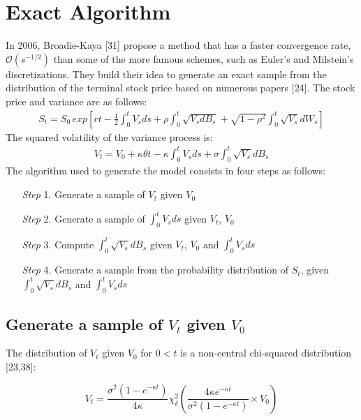 \documentclass[12pt,twoside]{reedthesis}
\theoremstyle{definition}
\theoremstyle{definition}
\theoremstyle{remark}
\begin{document}
  \section{Exact Algorithm}\label{exact-algorithm}
  
  In 2006, Broadie-Kaya {[}31{]} propose a method that has a faster
  convergence rate, \(\mathcal{O} \left( s^{-1/2} \right)\) than some of
  the more famous schemes, such as Euler's and Milstein's discretizations.
  They build their idea to generate an exact sample from the distribution
  of the terminal stock price based on numerous papers {[}24{]}. The stock
  price and variance are as follows:
  \begin{align} \label{eq:ea1}
  S_t = S_0 \, exp \left[ r t - \frac{1}{2} \int_{0}^{t}{V_s ds} + \rho  \int_{0}^{t}{\sqrt{V_s d B_s}} + \sqrt{1 - \rho^2} \int_{0}^{t}{\sqrt{V_s} dW_s}\right]
  \end{align}
  The squared volatility of the variance process is:
  \begin{align} \label{eq:ea2}
  V_t = V_0 + \kappa \theta t - \kappa \int_{0}^{t}{V_s ds} + \sigma \int_{0}^{t}{\sqrt{V_s} dB_s}
  \end{align}
  The algorithm used to generate the model consists in four steps as
  follows:
  \begin{itemize}
  \item [\textit{Step} 1.] Generate a sample of $V_t$ given $V_0$
  \item [\textit{Step} 2.] Generate a sample of $\displaystyle \int_0^t V_sds$ given $V_t$, $V_0$
  \item [\textit{Step} 3.] Compute $\displaystyle \int_0^t \sqrt{V_s}dB_s$ given $V_t$, $V_0$ and $\int_0^t V_sds$
  \item [\textit{Step} 4.] Generate a sample from the probability distribution of $S_t$, given $\displaystyle \int_0^t \sqrt{V_s}dB_s$ and $\displaystyle \int_0^t V_sds$
  \end{itemize}
  \subsection{\texorpdfstring{Generate a sample of \(V_t\) given
  \(V_0\)}{Generate a sample of V\_t given V\_0}}\label{generate-a-sample-of-v_t-given-v_0}
  
  The distribution of \(V_t\) given \(V_0\) for \(0 < t\) is a non-central
  chi-squared distribution {[}23,38{]}:
  
  \[V_t = \frac{\sigma^2 (1-e^{- \kappa t})}{4 \kappa} \chi_{\delta}^{2} \left( \frac{4 \kappa e^{- \kappa t}}{\sigma^2 (1- e^{- \kappa t})} \times V_0\right)\]
  
\end{document}
